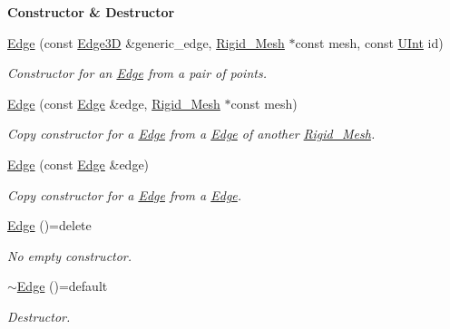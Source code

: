 \begin{Indent}{\bf Constructor \& Destructor}\par
\begin{DoxyCompactItemize}
\item 
\hyperlink{classFVCode3D_1_1Rigid__Mesh_1_1Edge_a8ee1d53f2c0aeaeef71111a92fb926fa}{Edge} (const \hyperlink{classFVCode3D_1_1Rigid__Mesh_a396039ac2943822c4652967ce1849c9f}{Edge3D} \&generic\+\_\+edge, \hyperlink{classFVCode3D_1_1Rigid__Mesh}{Rigid\+\_\+\+Mesh} $\ast$const mesh, const \hyperlink{namespaceFVCode3D_a4bf7e328c75d0fd504050d040ebe9eda}{U\+Int} id)
\begin{DoxyCompactList}\small\item\em Constructor for an \hyperlink{classFVCode3D_1_1Rigid__Mesh_1_1Edge}{Edge} from a pair of points. \end{DoxyCompactList}\item 
\hyperlink{classFVCode3D_1_1Rigid__Mesh_1_1Edge_a40c981d4fc36030d7dd3cbb0eacf631f}{Edge} (const \hyperlink{classFVCode3D_1_1Rigid__Mesh_1_1Edge}{Edge} \&edge, \hyperlink{classFVCode3D_1_1Rigid__Mesh}{Rigid\+\_\+\+Mesh} $\ast$const mesh)
\begin{DoxyCompactList}\small\item\em Copy constructor for a \hyperlink{classFVCode3D_1_1Rigid__Mesh_1_1Edge}{Edge} from a \hyperlink{classFVCode3D_1_1Rigid__Mesh_1_1Edge}{Edge} of another \hyperlink{classFVCode3D_1_1Rigid__Mesh}{Rigid\+\_\+\+Mesh}. \end{DoxyCompactList}\item 
\hyperlink{classFVCode3D_1_1Rigid__Mesh_1_1Edge_a7bda114bf36119f6a3b961bdca1decfa}{Edge} (const \hyperlink{classFVCode3D_1_1Rigid__Mesh_1_1Edge}{Edge} \&edge)
\begin{DoxyCompactList}\small\item\em Copy constructor for a \hyperlink{classFVCode3D_1_1Rigid__Mesh_1_1Edge}{Edge} from a \hyperlink{classFVCode3D_1_1Rigid__Mesh_1_1Edge}{Edge}. \end{DoxyCompactList}\item 
\hyperlink{classFVCode3D_1_1Rigid__Mesh_1_1Edge_a9bfc76d25f28a0ba7e6468cbe361e104}{Edge} ()=delete
\begin{DoxyCompactList}\small\item\em No empty constructor. \end{DoxyCompactList}\item 
\hyperlink{classFVCode3D_1_1Rigid__Mesh_1_1Edge_adbeccb7f6349ebc9aa703d433710cd1e}{$\sim$\+Edge} ()=default
\begin{DoxyCompactList}\small\item\em Destructor. \end{DoxyCompactList}\end{DoxyCompactItemize}
\end{Indent}

